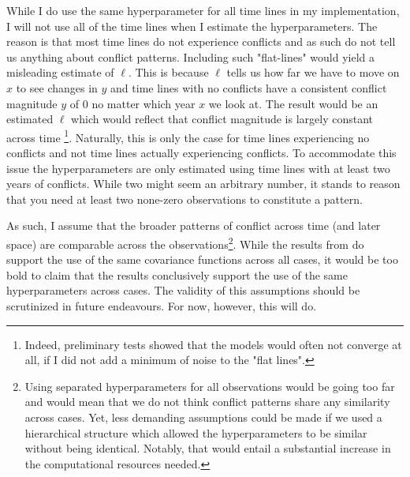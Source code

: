 \documentclass[a4paper]{article}
\begin{document}
%
While I do use the same hyperparameter for all time lines in my implementation, I will not use all of the time lines when I estimate the hyperparameters. The reason is that most time lines do not experience conflicts and as such do not tell us anything about conflict patterns. Including such "flat-lines" would yield a misleading estimate of $\ell$. This is because $\ell$ tells us how far we have to move on $x$ to see changes in $y$ and time lines with no conflicts have a consistent conflict magnitude $y$ of $0$ no matter which year $x$ we look at. The result would be an estimated $\ell$ which would reflect that conflict magnitude is largely constant across time \footnote{Indeed, preliminary tests showed that the models would often not converge at all, if I did not add a minimum of noise to the "flat lines".}. Naturally, this is only the case for time lines experiencing no conflicts and not time lines actually experiencing conflicts. To accommodate this issue the hyperparameters are only estimated using time lines with at least two years of conflicts. While two might seem an arbitrary number, it stands to reason that you need at least two none-zero observations to constitute a pattern.\par

As such, I assume that the broader patterns of conflict across time (and later space) are comparable across the observations\footnote{Using separated hyperparameters for all observations would be going too far and would mean that we do not think conflict patterns share any similarity across cases. Yet, less demanding assumptions could be made if we used a hierarchical structure which allowed the hyperparameters to be similar without being identical. Notably, that would entail a substantial increase in the computational resources needed.}. While the results from \cite{schutte2011diffusion} do support the use of the same covariance functions across all cases, it would be too bold to claim that the results conclusively support the use of the same hyperparameters across cases. The validity of this assumptions should be scrutinized in future endeavours. For now, however, this will do.\par

\end{document}
